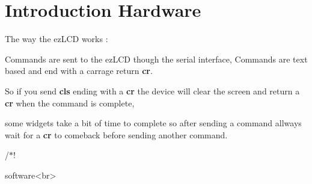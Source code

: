 \hypertarget{group__intro}{\section{Introduction Hardware}
\label{group__intro}
}
The way the ez\-L\-C\-D works \-:\par
 Commands are sent to the ez\-L\-C\-D though the serial interface, Commands are text based and end with a carrage return {\bfseries cr}.\par
 So if you send {\bfseries cls} ending with a {\bfseries cr} the device will clear the screen and return a {\bfseries cr} when the command is complete,\par
 some widgets take a bit of time to complete so after sending a command allways wait for a {\bfseries cr} to comeback before sending another command.\par


/$\ast$!

\begin{DoxyVerb} software<br>\end{DoxyVerb}
 